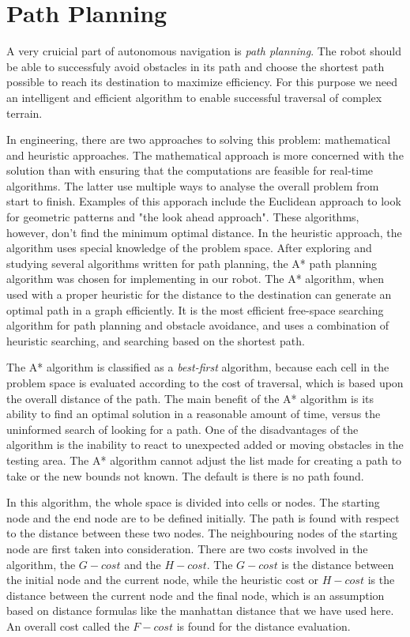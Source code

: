 \section{Path Planning}

A very cruicial part of autonomous navigation is \emph{path planning}. The robot should be able to successfuly avoid obstacles in its path and choose the shortest path possible to reach its destination to maximize efficiency. For this purpose we need an intelligent and efficient algorithm to enable successful traversal of complex terrain.

In engineering, there are two approaches to solving this problem: mathematical and heuristic approaches. The mathematical approach is more concerned with the solution than with ensuring that the computations are feasible for real-time algorithms. The latter use multiple ways to analyse the overall problem from start to finish. Examples of this apporach include the Euclidean approach to look for geometric patterns and "the look ahead approach". These algorithms, however, don't find the minimum optimal distance. In the heuristic approach, the algorithm uses special knowledge of the problem space. After exploring and studying several algorithms written for path planning, the A* path planning algorithm was chosen for implementing in our robot. The A* algorithm, when used with a proper heuristic for the distance to the destination can generate an optimal path in a graph efficiently. It is the most efficient free-space searching algorithm for path planning and obstacle avoidance, and uses a combination of heuristic searching, and searching based on the shortest path. 

The A* algorithm is classified as a \emph{best-first} algorithm, because each cell in the problem space is evaluated according to the cost of traversal, which is based upon the overall distance of the path. The main benefit of the A* algorithm is its ability to find an optimal solution in a reasonable amount of time, versus the uninformed search of looking for a path. One of the disadvantages of the algorithm is the inability to react to unexpected added or moving obstacles in the testing area. The A* algorithm cannot adjust the list made for creating a path to take or the new bounds not known. The default is there is no path found.

In this algorithm, the whole space is divided into cells or nodes. The starting node and the end node are to be defined initially. The path is found with respect to the distance between these two nodes. The neighbouring nodes of the starting node are first taken into consideration. There are two costs involved in the algorithm, the \(G-cost\) and the \(H-cost\). The \(G-cost\) is the distance between the initial node and the current node, while the heuristic cost or \(H-cost\) is the distance between the current node and the final node, which is an assumption based on distance formulas like the manhattan distance that we have used here. An overall cost called the \(F-cost\) is found for the distance evaluation.


